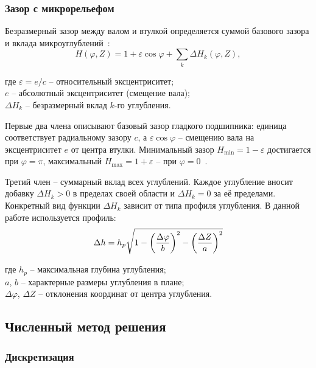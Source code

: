 \subsubsection{Зазор с микрорельефом}

Безразмерный зазор между валом и втулкой определяется суммой базового зазора и вклада микроуглублений~\cite{tala2012}:
\begin{equation}
    H(\varphi, Z) = 1 + \varepsilon\cos\varphi + \textstyle\sum_k \Delta H_k(\varphi, Z),
    \label{eq:clearance}
\end{equation}

\noindent где $\varepsilon = e/c$ -- относительный эксцентриситет;\\
\hphantom{где }$e$ -- абсолютный эксцентриситет (смещение вала);\\
\hphantom{где }$\Delta H_k$ -- безразмерный вклад $k$-го углубления.

Первые два члена описывают базовый зазор гладкого подшипника: единица соответствует радиальному зазору $c$, а $\varepsilon\cos\varphi$ -- смещению вала на эксцентриситет $e$ от центра втулки. Минимальный зазор $H_{\min} = 1 - \varepsilon$ достигается при $\varphi = \pi$, максимальный $H_{\max} = 1 + \varepsilon$ -- при $\varphi = 0$~\cite{pinkus}.

Третий член -- суммарный вклад всех углублений. Каждое углубление вносит добавку $\Delta H_k > 0$ в пределах своей области и $\Delta H_k = 0$ за её пределами. Конкретный вид функции $\Delta H_k$ зависит от типа профиля углубления. В данной работе используется \varDimpleTypeName{} профиль:
\begin{equation}
    \Delta h = h_p \sqrt{1 - \left(\frac{\Delta\varphi}{b}\right)^2 - \left(\frac{\Delta Z}{a}\right)^2}
    \label{eq:dimple_profile}
\end{equation}

\noindent где $h_p$ -- максимальная глубина углубления;\\
\hphantom{где }$a$, $b$ -- характерные размеры углубления в плане;\\
\hphantom{где }$\Delta\varphi$, $\Delta Z$ -- отклонения координат от центра углубления.

\subsection{Численный метод решения}

\subsubsection{Дискретизация}


